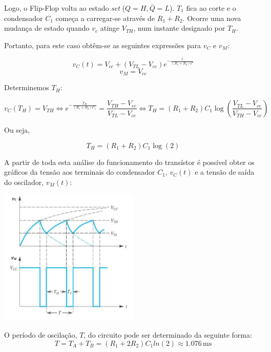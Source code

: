 \documentclass[a4paper,11pt]{report}
\begin{document}
Logo, o Flip-Flop volta ao estado \textit{set} ($Q=H,\bar{Q}=L$). $T_1$ fica ao corte e o condensador $C_1$ começa a carregar-se através de $R_1+R_2$. Ocorre uma nova mudança de estado quando $v_c$ atinge $V_{TH}$, num instante designado por $T_H$.

Portanto, para este caso obtêm-se as seguintes expressões para $v_C$ e $v_M$:

\begin{equation}
v_C(t)=V_{cc}+(V_{TL}-V_{cc})e^{-\frac{t}{{(R_1+R_2)}C}}
\end{equation}
\begin{equation}
v_M=V_{cc}
\end{equation}

Determinemos $T_H$:


$$v_C(T_H)=V_{TH}\Leftrightarrow e^{-\frac{T_H}{(R_1+R_2)C_1}}=\frac{V_{TH}-V_{cc}}{V_{TL}-V_{cc}}\Leftrightarrow T_H=(R_1+R_2)C_1\log{\left(\frac{V_{TL}-V_{cc}}{V_{TH}-V_{cc}}\right)}$$

Ou seja,

\begin{equation}
T_H=(R_1+R_2)C_1\log(2)
\end{equation}

A partir de toda esta análise do funcionamento do transístor é possível obter os gráficos da tensão aos terminais do condensador $C_1$, $v_C(t)$ e a tensão de saída do oscilador, $v_M(t)$:

    \begin{center}
    \includegraphics[angle=0,width=0.5\textwidth]{X.png}
    \label{fig:X}
    
    \end{center}


O período de oscilação, $T$, do circuito pode ser determinado da seguinte forma:
\begin{equation}
T=T_A+T_B=(R_1 + 2R_2)C_1ln(2)\approx 1.076\,\textrm{ms}
\end{equation}
\end{document}
